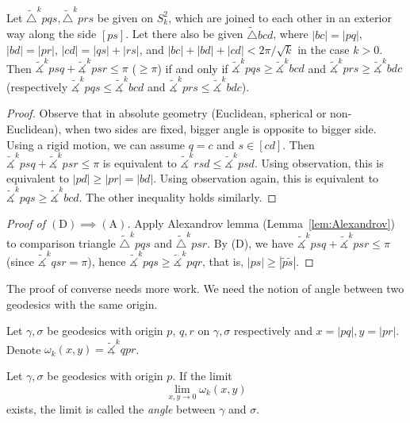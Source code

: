 \begin{lem}[Alexandrov]\label{lem:Alexandrov}
    Let $\tilde{\triangle}^kpqs,\tilde{\triangle}^kprs$ be given on $S^2_k$, which are joined to each other in an exterior way along the side $[ps]$.
    Let there also be given $\tilde{\triangle}bcd$, where $|bc|=|pq|$, $|bd|=|pr|$, $|cd|=|qs|+|rs|$, and $|bc|+|bd|+|cd|<2\pi/\sqrt{k}$ in the case $k>0$.
    Then $\tilde{\measuredangle}^kpsq+\tilde{\measuredangle}^kpsr\leq\pi$ ($\geq\pi$) if and only if $\tilde{\measuredangle}^kpqs\geq\tilde{\measuredangle}^kbcd$ and $\tilde{\measuredangle}^kprs\geq\tilde{\measuredangle}^kbdc$ (respectively $\tilde{\measuredangle}^kpqs\leq\tilde{\measuredangle}^kbcd$ and $\tilde{\measuredangle}^kprs\leq\tilde{\measuredangle}^kbdc$).
\end{lem}
\begin{proof}
    Observe that in absolute geometry (Euclidean, spherical or non-Euclidean), when two sides are fixed, bigger angle is opposite to bigger side.
    Using a rigid motion, we can assume $q=c$ and $s\in[cd]$.
    Then $\tilde{\measuredangle}^kpsq+\tilde{\measuredangle}^kpsr\leq\pi$ is equivalent to $\tilde{\measuredangle}^krsd\leq\tilde{\measuredangle}^kpsd$.
    Using observation, this is equivalent to $|pd|\geq|pr|=|bd|$.
    Using observation again, this is equivalent to $\tilde{\measuredangle}^kpqs\geq\tilde{\measuredangle}^kbcd$.
    The other inequality holds similarly.
\end{proof}

\begin{proof}[Proof of $\mathrm{(D)}\implies\mathrm{(A)}$]
    Apply Alexandrov lemma (Lemma~\ref{lem:Alexandrov}) to comparison triangle $\tilde{\triangle}^kpqs$ and $\tilde{\triangle}^kpsr$.
    By (D), we have $\tilde{\measuredangle}^kpsq+\tilde{\measuredangle}^kpsr\leq\pi$ (since $\tilde{\measuredangle}^kqsr=\pi$), hence $\tilde{\measuredangle}^kpqs\geq\tilde{\measuredangle}^kpqr$, that is, $|ps|\geq|\tilde{p}\tilde{s}|$.
\end{proof}

The proof of converse needs more work.
We need the notion of angle between two geodesics with the same origin.

\begin{nota}
    Let $\gamma,\sigma$ be geodesics with origin $p$, $q,r$ on $\gamma,\sigma$ respectively and $x=|pq|,y=|pr|$.
    Denote $\omega_k(x,y)=\tilde{\measuredangle}^kqpr$.
\end{nota}

\begin{defn}\label{defn:angle}
    Let $\gamma,\sigma$ be geodesics with origin $p$.
    If the limit
    \[\lim_{x,y\to 0}\omega_k(x,y)\]
    exists, the limit is called the \emph{angle} between $\gamma$ and $\sigma$.
\end{defn}


